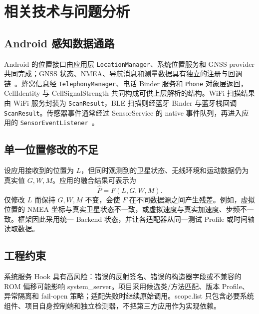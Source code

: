 \section{相关技术与问题分析}
\subsection{Android 感知数据通路}
Android 的位置接口由应用层 \texttt{LocationManager}、系统位置服务和 GNSS provider 共同完成；GNSS 状态、NMEA、导航消息和测量数据具有独立的注册与回调链~\citep{androidlocation}。蜂窝信息经 \texttt{TelephonyManager}、电话 Binder 服务和 \texttt{Phone} 对象层返回，CellIdentity 与 CellSignalStrength 共同构成可供上层解析的结构。WiFi 扫描结果由 WiFi 服务封装为 \texttt{ScanResult}，BLE 扫描则经蓝牙 Binder 与蓝牙栈回调 \texttt{ScanResult}。传感器事件通常经过 SensorService 的 native 事件队列，再进入应用的 \texttt{SensorEventListener}~\citep{androidsensor}。

\subsection{单一位置修改的不足}
设应用接收到的位置为 $L$，但同时观测到的卫星状态、无线环境和运动数据仍为真实值 $G,W,M$。应用的融合结果可表示为
\[
  \hat{P}=F(L,G,W,M).
\]
仅修改 $L$ 而保持 $G,W,M$ 不变，会使 $F$ 在不同数据源之间产生残差。例如，虚拟位置的 NMEA 坐标与真实卫星状态不一致，或虚拟速度与真实加速度、步频不一致。框架因此采用统一 Backend 状态，并让各适配器从同一测试 Profile 或时间轴读取数据。

\subsection{工程约束}
系统服务 Hook 具有高风险：错误的反射签名、错误的构造器字段或不兼容的 ROM 偏移可能影响 system\_server。项目采用候选类/方法匹配、版本 Profile、异常隔离和 fail-open 策略；适配失败时继续原始调用。scope.list 只包含必要系统组件、项目自身控制端和独立检测器，不把第三方应用作为实现依赖。
